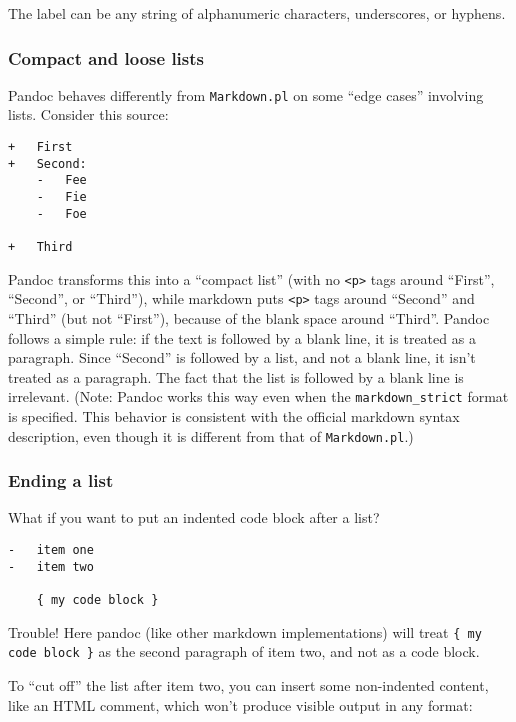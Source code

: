 \documentclass[]{article}
\begin{document}
The label can be any string of alphanumeric characters, underscores, or
hyphens.

\subsubsection{Compact and loose lists}\label{compact-and-loose-lists}

Pandoc behaves differently from \texttt{Markdown.pl} on some ``edge
cases'' involving lists. Consider this source:

\begin{verbatim}
+   First
+   Second:
    -   Fee
    -   Fie
    -   Foe

+   Third
\end{verbatim}

Pandoc transforms this into a ``compact list'' (with no
\texttt{\textless{}p\textgreater{}} tags around ``First'', ``Second'',
or ``Third''), while markdown puts \texttt{\textless{}p\textgreater{}}
tags around ``Second'' and ``Third'' (but not ``First''), because of the
blank space around ``Third''. Pandoc follows a simple rule: if the text
is followed by a blank line, it is treated as a paragraph. Since
``Second'' is followed by a list, and not a blank line, it isn't treated
as a paragraph. The fact that the list is followed by a blank line is
irrelevant. (Note: Pandoc works this way even when the
\texttt{markdown\_strict} format is specified. This behavior is
consistent with the official markdown syntax description, even though it
is different from that of \texttt{Markdown.pl}.)

\subsubsection{Ending a list}\label{ending-a-list}

What if you want to put an indented code block after a list?

\begin{verbatim}
-   item one
-   item two

    { my code block }
\end{verbatim}

Trouble! Here pandoc (like other markdown implementations) will treat
\texttt{\{ my code block \}} as the second paragraph of item two, and
not as a code block.

To ``cut off'' the list after item two, you can insert some non-indented
content, like an HTML comment, which won't produce visible output in any
format:
\end{document}
